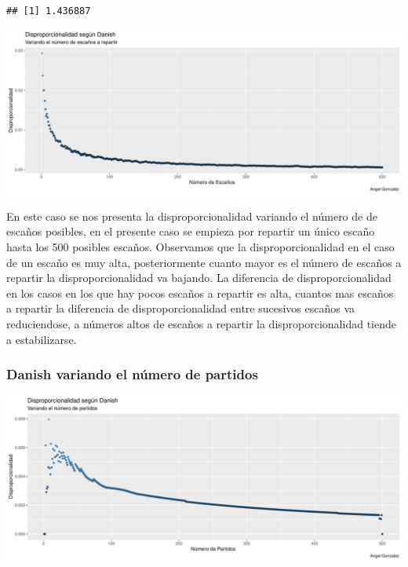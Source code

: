 \documentclass[12pt,a4paper,]{book}
\numberwithin{dummy}{section}
\theoremstyle{ocrenumbox}
\theoremstyle{blacknumex}
\theoremstyle{blacknumbox}
\theoremstyle{ocrenum}
\theoremstyle{ocrenum}
\begin{document}
\begin{verbatim}
## [1] 1.436887
\end{verbatim}

\begin{center}\includegraphics[width=0.95\linewidth]{figurasR/unnamed-chunk-39-1} \end{center}

En este caso se nos presenta la disproporcionalidad variando el número
de de escaños posibles, en el presente caso se empieza por repartir un
único escaño hasta los 500 posibles escaños. Observamos que la
disproporcionalidad en el caso de un escaño es muy alta, posteriormente
cuanto mayor es el número de escaños a repartir la disproporcionalidad
va bajando. La diferencia de disproporcionalidad en los casos en los que
hay pocos escaños a repartir es alta, cuantos mas escaños a repartir la
diferencia de disproporcionalidad entre sucesivos escaños va
reduciendose, a números altos de escaños a repartir la
disproporcionalidad tiende a estabilizarse.

\hypertarget{danish-variando-el-nuxfamero-de-partidos}{%
\subsubsection{Danish variando el número de
partidos}\label{danish-variando-el-nuxfamero-de-partidos}}

\begin{center}\includegraphics[width=0.95\linewidth]{figurasR/unnamed-chunk-40-1} \end{center}
\end{document}
